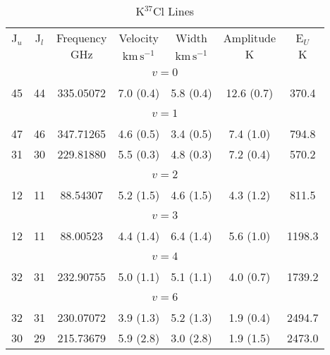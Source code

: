 \begin{table*}[htp]
\centering
\caption{K$^{37}$Cl Lines}
\begin{tabular}{ccccccc}
\label{tab:K37Cl_salt_lines}
 J$_u$ & J$_l$ & Frequency & Velocity & Width & Amplitude & E$_U$ \\
  &  & $\mathrm{GHz}$ & $\mathrm{km\,s^{-1}}$ & $\mathrm{km\,s^{-1}}$ & $\mathrm{K}$ & $\mathrm{K}$ \\
\hline
&\vspace{-0.75em}\\
\multicolumn{7}{c}{$v = 0$} \\
\vspace{-0.75em}\\
 45 & 44 & 335.05072 & 7.0 (0.4) & 5.8 (0.4) & 12.6 (0.7) & 370.4 \\
&\vspace{-0.75em}\\
\multicolumn{7}{c}{$v = 1$} \\
\vspace{-0.75em}\\
 47 & 46 & 347.71265 & 4.6 (0.5) & 3.4 (0.5) & 7.4 (1.0) & 794.8 \\
 31 & 30 & 229.81880 & 5.5 (0.3) & 4.8 (0.3) & 7.2 (0.4) & 570.2 \\
&\vspace{-0.75em}\\
\multicolumn{7}{c}{$v = 2$} \\
\vspace{-0.75em}\\
 12 & 11 & 88.54307 & 5.2 (1.5) & 4.6 (1.5) & 4.3 (1.2) & 811.5 \\
&\vspace{-0.75em}\\
\multicolumn{7}{c}{$v = 3$} \\
\vspace{-0.75em}\\
 12 & 11 & 88.00523 & 4.4 (1.4) & 6.4 (1.4) & 5.6 (1.0) & 1198.3 \\
&\vspace{-0.75em}\\
\multicolumn{7}{c}{$v = 4$} \\
\vspace{-0.75em}\\
 32 & 31 & 232.90755 & 5.0 (1.1) & 5.1 (1.1) & 4.0 (0.7) & 1739.2 \\
&\vspace{-0.75em}\\
\multicolumn{7}{c}{$v = 6$} \\
\vspace{-0.75em}\\
 32 & 31 & 230.07072 & 3.9 (1.3) & 5.2 (1.3) & 1.9 (0.4) & 2494.7 \\
 30 & 29 & 215.73679 & 5.9 (2.8) & 3.0 (2.8) & 1.9 (1.5) & 2473.0 \\
\hline
\end{tabular}

\par 
\end{table*}
